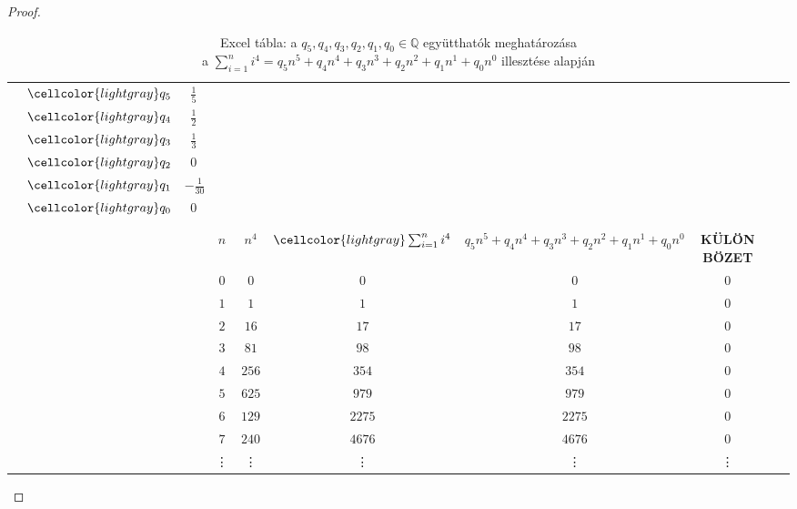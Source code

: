 \documentclass{article}
\newcommand{\gry}{\cellcolor{lightgray}}
\newcommand{\blu}{\cellcolor{blue!33}}
\newcommand{\ylw}{\cellcolor{yellow}}
\newcommand{\lyl}{\cellcolor{yellow!33}}
\newcommand{\myl}{\cellcolor{yellow!55}}
\begin{document}
\begin{proof}
		\setlength{\extrarowheight}{2px}
		\begin{table}[H]
			\caption*{Excel tábla: a $q_5, q_4, q_3, q_2, q_1, q_0 \in \mathbb Q$ együtthatók meghatározása\\a $\sum_{i=1}^ni^4 = q_5n^5+q_4n^4+q_3n^3+q_2n^2+q_1n^1+q_0n^0$ illesztése alapján}
			\begin{tabular}{|c|c|c|c|c|c|c|c|c|c|}
				\hline
				&&&&&&&&&\\\hline
				&$\gry q_5$&\ylw $\frac15$&&&&&&&\\\hline
				&$\gry q_4$&\ylw $\frac12$&&&&&&&\\\hline
				&$\gry q_3$&\ylw $\frac13$&&&&&&&\\\hline
				&$\gry q_2$&\ylw $0$&&&&&&&\\\hline
				&$\gry q_1$&\ylw $-\frac1{30}$&&&&&&&\\\hline
				&$\gry q_0$&\ylw $0$&&&&&&&\\\hline
				&&&&&&&&&\\\hline
				&&&&&&&&&\\\hline
				&&&\gry $n$ &	 \gry $n^4$      &$\gry \sum_{i=1}^ni^4$& \gry $q_5n^5+q_4n^4+q_3n^3+q_2n^2+q_1n^1+q_0n^0$&\blu\bf KÜLÖNBÖZET  &                 &             \\\hline
				&&&\lyl$0$ &\lyl     $0$      &\lyl       $0$       &\lyl       $0$&\myl$0$                                            &                 &             \\\hline
				&&&\lyl$1$ &\lyl     $1$      &\lyl       $1$          &\lyl       $1$&\myl$0$                                         &                 &             \\\hline
				&&&\lyl$2$ &\lyl    $16$      &\lyl      $17$           &\lyl      $17$&\myl$0$                                        &                 &             \\\hline
				&&&\lyl$3$ &\lyl    $81$      &\lyl      $98$          &\lyl      $98$&\myl$0$                                         &                 &             \\\hline
				&&&\lyl$4$ &\lyl   $256$      &\lyl     $354$          &\lyl     $354$&\myl$0$                                         &                 &             \\\hline
				&&&\lyl$5$ &\lyl   $625$      &\lyl     $979$          &\lyl     $979$&\myl$0$                                         &                 &             \\\hline
				&&&\lyl$6$ &\lyl  $1296$      &\lyl    $2275$         &\lyl    $2275$&\myl$0$                                          &                 &             \\\hline
				&&&\lyl$7$ &\lyl  $2401$      &\lyl    $4676$         &\lyl    $4676$&\myl$0$                                          &                 &             \\\hline
				&&&\lyl\vdots&\lyl\vdots      & \lyl\vdots         &    \lyl\vdots&\myl\vdots                                       &                 &             \\
			\end{tabular}
		\end{table}
		\setlength{\extrarowheight}{0px}
	\end{proof}
\end{document}
